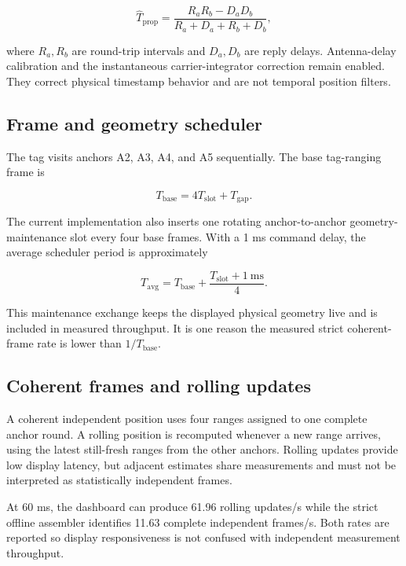 \documentclass[11pt,a4paper]{article}
\begin{document}
\begin{equation}
  \widehat{T}_{\mathrm{prop}} =
  \frac{R_aR_b-D_aD_b}{R_a+D_a+R_b+D_b},
\end{equation}

where $R_a,R_b$ are round-trip intervals and $D_a,D_b$ are reply delays.
Antenna-delay calibration and the instantaneous carrier-integrator correction
remain enabled. They correct physical timestamp behavior and are not temporal
position filters.

\subsection{Frame and geometry scheduler}

The tag visits anchors A2, A3, A4, and A5 sequentially. The base tag-ranging
frame is

\begin{equation}
  T_{\mathrm{base}} = 4T_{\mathrm{slot}} + T_{\mathrm{gap}}.
\end{equation}

The current implementation also inserts one rotating anchor-to-anchor
geometry-maintenance slot every four base frames. With a 1 ms command delay,
the average scheduler period is approximately

\begin{equation}
  T_{\mathrm{avg}} =
  T_{\mathrm{base}} +
  \frac{T_{\mathrm{slot}}+1\ \mathrm{ms}}{4}.
\end{equation}

This maintenance exchange keeps the displayed physical geometry live and is
included in measured throughput. It is one reason the measured strict
coherent-frame rate is lower than $1/T_{\mathrm{base}}$.

\subsection{Coherent frames and rolling updates}

A coherent independent position uses four ranges assigned to one complete
anchor round. A rolling position is recomputed whenever a new range arrives,
using the latest still-fresh ranges from the other anchors. Rolling updates
provide low display latency, but adjacent estimates share measurements and
must not be interpreted as statistically independent frames.

At 60 ms, the dashboard can produce 61.96 rolling updates/s while the strict
offline assembler identifies 11.63 complete independent frames/s. Both rates
are reported so display responsiveness is not confused with independent
measurement throughput.
\end{document}
